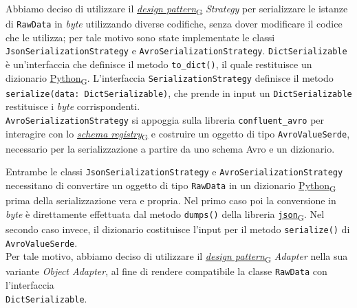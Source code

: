 Abbiamo deciso di utilizzare il \href{https://7last.github.io/docs/pb/documentazione-interna/glossario\#design-pattern}{\textit{design pattern}\textsubscript{G}} \textit{Strategy} per serializzare le istanze di \texttt{RawData} in \textit{byte} utilizzando diverse codifiche, senza dover modificare il codice che le utilizza;
per tale motivo sono state implementate le classi \\\texttt{JsonSerializationStrategy} e \texttt{AvroSerializationStrategy}.
\texttt{DictSerializable} è un'interfaccia che definisce il metodo \texttt{to\_dict()}, il quale restituisce un dizionario \href{https://7last.github.io/docs/pb/documentazione-interna/glossario\#python}{Python\textsubscript{G}}.
L'interfaccia \texttt{SerializationStrategy} definisce il metodo \texttt{serialize(data: DictSerializable)}, che prende in input un \texttt{DictSerializable} restituisce i \textit{byte} corrispondenti.
\\\texttt{AvroSerializationStrategy} si appoggia sulla libreria \texttt{confluent\_avro} per interagire con lo \href{https://7last.github.io/docs/pb/documentazione-interna/glossario\#schema-registry}{\textit{schema registry}\textsubscript{G}} e costruire un oggetto di tipo
\texttt{AvroValueSerde}, necessario per la serializzazione a partire da uno schema Avro e un dizionario.

Entrambe le classi \texttt{JsonSerializationStrategy} e \texttt{AvroSerializationStrategy} necessitano di convertire un oggetto di tipo \texttt{RawData} in un dizionario \href{https://7last.github.io/docs/pb/documentazione-interna/glossario\#python}{Python\textsubscript{G}}
prima della serializzazione vera e propria. Nel primo caso poi la conversione in \textit{byte} è direttamente effettuata dal metodo \texttt{dumps()} della libreria \href{https://7last.github.io/docs/pb/documentazione-interna/glossario\#javascript-object-notation}{\texttt{json}\textsubscript{G}}. Nel
secondo caso invece, il dizionario costituisce l'input per il metodo \texttt{serialize()} di \texttt{AvroValueSerde}.\\
Per tale motivo, abbiamo deciso di utilizzare il \href{https://7last.github.io/docs/pb/documentazione-interna/glossario\#design-pattern}{\textit{design pattern}\textsubscript{G}} \textit{Adapter} nella sua variante \textit{Object Adapter}, al fine di rendere compatibile la classe \texttt{RawData}
con l'interfaccia \\\texttt{DictSerializable}.

